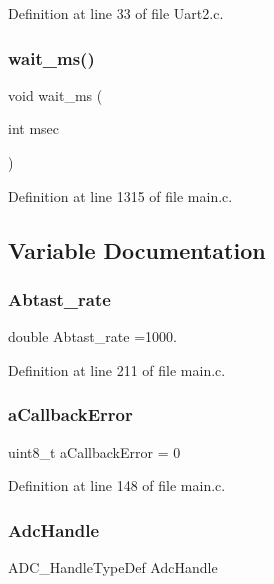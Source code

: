 Definition at line 33 of file Uart2.\+c.

\mbox{\label{main_8c_afad8aa90d3f050d853049cb8cd30a2db}} 
\subsubsection{wait\+\_\+ms()}
{\footnotesize\ttfamily void wait\+\_\+ms (\begin{DoxyParamCaption}\item[{int}]{msec }\end{DoxyParamCaption})}



Definition at line 1315 of file main.\+c.



\subsection{Variable Documentation}
\mbox{\label{main_8c_a219ec9ce258727719706ed9aba2e06e2}} 
\subsubsection{Abtast\+\_\+rate}
{\footnotesize\ttfamily double Abtast\+\_\+rate =1000.}



Definition at line 211 of file main.\+c.

\mbox{\label{main_8c_af691f61635878f78b5003f07958fc994}} 
\subsubsection{a\+Callback\+Error}
{\footnotesize\ttfamily uint8\+\_\+t a\+Callback\+Error = 0}



Definition at line 148 of file main.\+c.

\mbox{\label{main_8c_a35c38ca7a8210322754a21a7009e1021}} 
\subsubsection{Adc\+Handle}
{\footnotesize\ttfamily A\+D\+C\+\_\+\+Handle\+Type\+Def Adc\+Handle}



